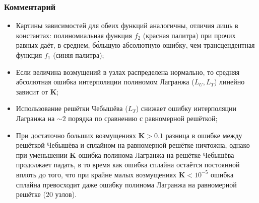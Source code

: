 \subsubsection*{Комментарий}
\begin{itemize}
    \item Картины зависимостей для обеих функций аналогичны, отличия лишь в константах: полиномиальная функция $f_2$ (красная палитра) при прочих равных даёт, в среднем, б\'{о}льшую абсолютную ошибку, чем трансцендентная функция $f_1$ (синяя палитра);
    \item Если величина возмущений в узлах распределена нормально, то средняя абсолютная ошибка интерполяции полиномом Лагранжа ($L_U, L_T$) линейно зависит от $\mathbf{K}$;
    \item Использование решётки Чебышёва ($L_T$) снижает ошибку интерполяции Лагранжа на $\sim2$ порядка по сравнению с равномерной решёткой;
    \item При  достаточно больших возмущениях $\mathbf{K}>0.1$ разница в ошибке между решёткой Чебышёва и сплайном на равномерной решётке ничтожна, однако при уменьшении $\mathbf{K}$ ошибка полинома Лагранжа на решётке Чебышёва продолжает падать, в то время как ошибка сплайна остаётся постоянной вплоть до того, что при крайне малых возмущениях $\mathbf{K}< 10^{-5}$ ошибка сплайна превосходит даже ошибку полинома Лагранжа на равномерной решётке (20 узлов).
\end{itemize}
\clearpage

